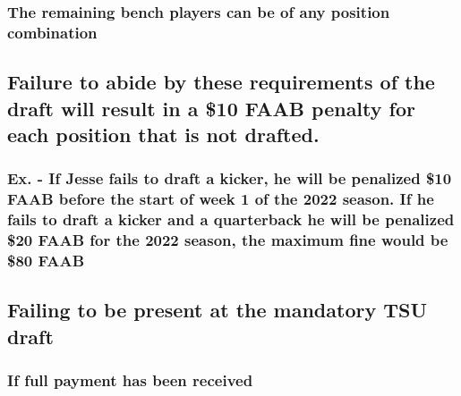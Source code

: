 \documentclass[
]{book}
\begin{document}
\hypertarget{the-remaining-bench-players-can-be-of-any-position-combination}{%
\subsubsection{The remaining bench players can be of any position combination}\label{the-remaining-bench-players-can-be-of-any-position-combination}}

\hypertarget{failure-to-abide-by-these-requirements-of-the-draft-will-result-in-a-10-faab-penalty-for-each-position-that-is-not-drafted.}{%
\subsection{Failure to abide by these requirements of the draft will result in a \$10 FAAB penalty for each position that is not drafted.}\label{failure-to-abide-by-these-requirements-of-the-draft-will-result-in-a-10-faab-penalty-for-each-position-that-is-not-drafted.}}

\hypertarget{ex.---if-jesse-fails-to-draft-a-kicker-he-will-be-penalized-10-faab-before-the-start-of-week-1-of-the-2022-season.-if-he-fails-to-draft-a-kicker-and-a-quarterback-he-will-be-penalized-20-faab-for-the-2022-season-the-maximum-fine-would-be-80-faab}{%
\subsubsection{Ex. - If Jesse fails to draft a kicker, he will be penalized \$10 FAAB before the start of week 1 of the 2022 season. If he fails to draft a kicker and a quarterback he will be penalized \$20 FAAB for the 2022 season, the maximum fine would be \$80 FAAB}\label{ex.---if-jesse-fails-to-draft-a-kicker-he-will-be-penalized-10-faab-before-the-start-of-week-1-of-the-2022-season.-if-he-fails-to-draft-a-kicker-and-a-quarterback-he-will-be-penalized-20-faab-for-the-2022-season-the-maximum-fine-would-be-80-faab}}

\hypertarget{failing-to-be-present-at-the-mandatory-tsu-draft}{%
\subsection{Failing to be present at the mandatory TSU draft}\label{failing-to-be-present-at-the-mandatory-tsu-draft}}

\hypertarget{if-full-payment-has-been-received}{%
\subsubsection{If full payment has been received}\label{if-full-payment-has-been-received}}
\end{document}
